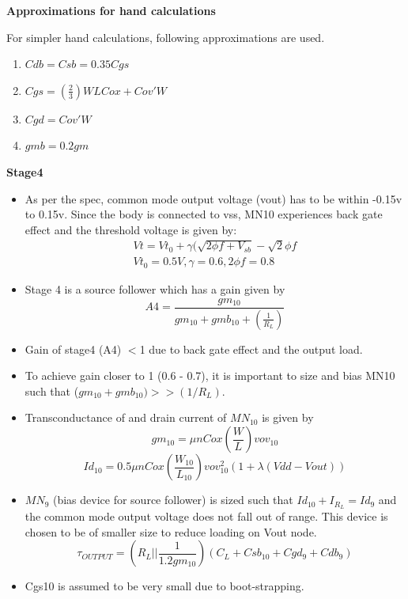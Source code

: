 \documentclass[12pt,a4paper]{article}
\begin{document}
\textbf{Approximations for hand calculations}

For simpler hand calculations, following approximations are used.

\begin{enumerate}
\item $Cdb=Csb=0.35 Cgs$
\item $Cgs=(\frac{2}{3})WLCox+Cov'W$
\item $Cgd=Cov'W$
\item $gmb=0.2gm$
\setcounter{numberedCntBB}{\theenumi}
\end{enumerate}


\textbf{Stage4}

\begin{itemize}
	\item As per the spec, common mode output voltage (vout) has to be within -0.15v to 0.15v. Since the body is connected to vss, MN10 experiences back gate effect and the threshold voltage is given by:
	\begin{equation}
	\begin{split}
		Vt=Vt_0+ \gamma(\sqrt{2\phi f+V_{sb}}- \sqrt{2}\phi f\\
		Vt_0=0.5V , \gamma=0.6 , 2\phi f=0.8
	\end{split}
	\end{equation}


	\item Stage 4 is a source follower which has a gain given by
	\begin{equation}
		A4=\frac{gm_{10}}{gm_{10}+gmb_{10}+(\frac{1}{R_L})}
	\end{equation}
	\item Gain of stage4 (A4) $<$1 due to back gate effect and the output load. 
	\item To achieve gain closer to 1 (0.6 - 0.7), it is important to size and bias MN10 such that ($gm_{10}+ gmb_{10}) >> (1/R_L)$. 
	\item Transconductance of and drain current of $MN_{10}$ is given by 
	\begin{equation}
		gm_{10}= \mu nCox(\frac{W}{L})vov_{10}
	\end{equation}
	\begin{equation}
		Id_{10}=0.5\mu nCox(\frac{W_{10}}{L_{10}})vov_{10}^2 (1+\lambda (Vdd-Vout))
	\end{equation}
	\item $MN_9$ (bias device for source follower) is sized such that $Id_{10}+ I_{R_L}= Id_9$ and the common mode output voltage does not fall out of range. This device is chosen to be of smaller size to reduce loading on Vout node. 
	\begin{equation}
		\tau_{OUTPUT} = (R_L || \frac{1}{1.2gm_{10}})(C_L+Csb_{10}+Cgd_9+Cdb_9)
	\end{equation}
	\item Cgs10 is assumed to be very small due to boot-strapping.
\end{itemize}
\end{document}
